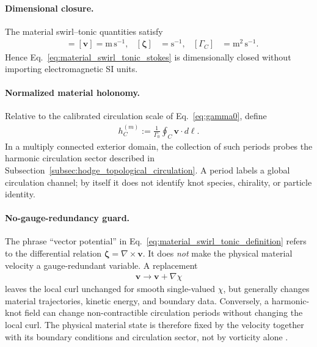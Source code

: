     \paragraph{Dimensional closure.}
    The material swirl--tonic quantities satisfy
    \begin{align}
        [\mathbf A_{\rm st}^{(m)}]
        &=[\mathbf v]=\mathrm{m\,s^{-1}},
        &
        [\boldsymbol{\zeta}]
        &=\mathrm{s^{-1}},
        &
        [\Gamma_C]
        &=\mathrm{m^2\,s^{-1}}.
        \label{eq:material_swirl_tonic_dimensions}
    \end{align}
    Hence Eq.~\eqref{eq:material_swirl_tonic_stokes} is dimensionally closed without
    importing electromagnetic SI units.

    \paragraph{Normalized material holonomy.}
    Relative to the calibrated circulation scale of Eq.~\eqref{eq:gamma0}, define
    \begin{align}
        h_C^{(m)}
        :=
        \frac{1}{\Gamma_0}
        \oint_C\mathbf v\cdot d\boldsymbol\ell .
        \label{eq:material_swirl_tonic_holonomy}
    \end{align}
    In a multiply connected exterior domain, the collection of such periods probes
    the harmonic circulation sector described in
    Subsection~\ref{subsec:hodge_topological_circulation}.  A period labels a global
    circulation channel; by itself it does not identify knot species, chirality, or
    particle identity.

    \paragraph{No-gauge-redundancy guard.}
    The phrase ``vector potential'' in
    Eq.~\eqref{eq:material_swirl_tonic_definition} refers to the differential
    relation $\boldsymbol{\zeta}=\nabla\times\mathbf v$.  It does \emph{not} make the
    physical material velocity a gauge-redundant variable.  A replacement
    \begin{align}
        \mathbf v\longrightarrow\mathbf v+\nabla\chi
        \label{eq:material_swirl_tonic_nogauge}
    \end{align}
    leaves the local curl unchanged for smooth single-valued $\chi$, but generally
    changes material trajectories, kinetic energy, and boundary data.  Conversely,
    a harmonic-knot field can change non-contractible circulation periods without
    changing the local curl.  The physical material state is therefore fixed by the
    velocity together with its boundary conditions and circulation sector, not by
    vorticity alone \cite{CantarellaDeTurckGluck2002Hodge}.

